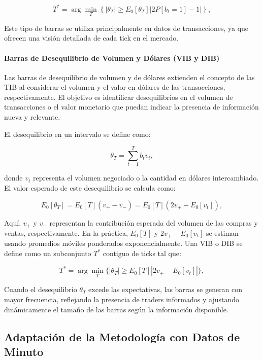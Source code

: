 \documentclass[a4paper,12pt, twoside]{report}
\begin{document}
\begin{equation}
T^* = \arg \min_T \left\{  | \theta_T | \geq E_0[\theta_T] |2P[b_t = 1] - 1 | \right\},
\end{equation}

Este tipo de barras se utiliza principalmente en datos de transacciones, ya que ofrecen una visión detallada de cada tick 
en el mercado.

\paragraph{Barras de Desequilibrio de Volumen y Dólares (VIB y DIB)}

Las barras de desequilibrio de volumen y de dólares extienden el concepto de las TIB al considerar el volumen 
y el valor en dólares de las transacciones, respectivamente. El objetivo es identificar desequilibrios en el volumen de 
transacciones o el valor monetario que puedan indicar la presencia de información nueva y relevante.

El desequilibrio en un intervalo se define como:

\begin{equation}
\theta_T = \sum_{t=1}^{T} b_t v_t,
\end{equation}

donde \(v_t\) representa el volumen negociado o la cantidad en dólares intercambiado. El valor esperado de este desequilibrio 
se calcula como:

\begin{equation}
E_0[\theta_T] = E_0[T](v_+ - v_-) = E_0[T](2v_+ - E_0[v_t]),
\end{equation}

Aquí, \(v_+\) y \(v_-\) representan la contribución esperada del volumen de las compras y ventas, respectivamente. En la 
práctica, \(E_0[T]\) y \(2v_+ - E_0[v_t]\) se estiman usando promedios móviles ponderados exponencialmente. Una VIB o DIB 
se define como un subconjunto \(T^*\) contiguo de ticks tal que:

\begin{equation}
T^* = \arg \min_{T} \{|\theta_T| \geq E_0[T]|2v_+ - E_0[v_t]| \},
\end{equation}

Cuando el desequilibrio \(\theta_T\) excede las expectativas, las barras se generan con mayor frecuencia, reflejando la 
presencia de traders informados y ajustando dinámicamente el tamaño de las barras según la información disponible.

\subsection{Adaptación de la Metodología con Datos de Minuto}
\end{document}
